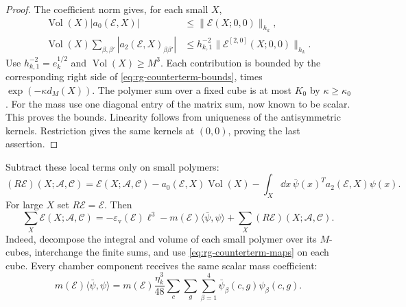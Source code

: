 \begin{proof}
The coefficient norm gives, for each small $X$,
\begin{equation}\label{eq:rg-single-extraction-bounds}
 \begin{split}
 \operatorname{Vol}(X)|a_0(\mathscr E,X)|
                    &\le\|\mathscr E(X;0,0)\|_{h_k},\\
 \operatorname{Vol}(X)\sum_{\beta,\beta'}
                              |a_2(\mathscr E,X)_{\beta\beta'}|
                    &\le h_{k,1}^{-2}
                               \|\mathscr E^{[2,0]}(X;0,0)\|_{h_k}.
 \end{split}
\end{equation}
Use $h_{k,1}^{-2}=e_k^{1/2}$ and
$\operatorname{Vol}(X)\ge M^3$. Each contribution is bounded
by the corresponding right side of
\eqref{eq:rg-counterterm-bounds}, times $\exp(-\kappa d_M(X))$.
The polymer sum over a fixed cube is at most $K_0$ by
$\kappa\ge\kappa_0$. For the mass use one diagonal entry of
the matrix sum, now known to be scalar. This proves the bounds.
Linearity follows from uniqueness of the antisymmetric kernels.
Restriction gives the same kernels at $(0,0)$, proving the
last assertion.
\end{proof}

Subtract these local terms only on small polymers:
\begin{equation}\label{eq:rg-normalized-remainder}
 (R\mathscr E)(X;\mathscr A,\mathscr C)
 =\mathscr E(X;\mathscr A,\mathscr C)
       -a_0(\mathscr E,X)\operatorname{Vol}(X)
       -\int_X\dd x\,\bar\psi(x)^Ta_2(\mathscr E,X)\psi(x).
\end{equation}
For large $X$ set $R\mathscr E=\mathscr E$. Then
\begin{equation}\label{eq:rg-exact-extraction-identity}
 \sum_X\mathscr E(X;\mathscr A,\mathscr C)
  =-\varepsilon_{\mathrm v}(\mathscr E)\ell^3
     -m(\mathscr E)\langle\bar\psi,\psi\rangle
                           +\sum_X(R\mathscr E)(X;\mathscr A,\mathscr C).
\end{equation}
Indeed, decompose the integral and volume of each small polymer
over its $M$-cubes, interchange the finite sums, and use
\eqref{eq:rg-counterterm-maps} on each cube. Every chamber
component receives the same scalar mass coefficient:
\[
 m(\mathscr E)\langle\bar\psi,\psi\rangle
 =m(\mathscr E)\frac{\eta_k^3}{48}
         \sum_c\sum_g\sum_{\beta=1}^4
                                      \bar\psi_\beta(c,g)\psi_\beta(c,g).
\]

